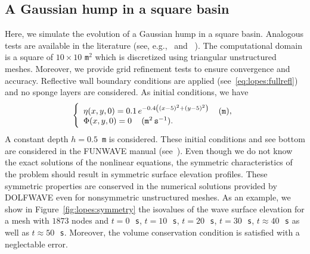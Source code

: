\subsection{A Gaussian hump in a square basin}
Here, we simulate the evolution of a Gaussian hump in a
square basin. Analogous tests are available in the
literature (see, e.g.,~\citet{WeiKirby1995} and
~\citet{WooLiu2004a}).
 The computational domain is a square
of \(10\times 10\) {\tt m}\(^2\) which is discretized using
triangular unstructured meshes.
Moreover, we provide grid
refinement tests to ensure convergence and accuracy.
Reflective wall boundary conditions are applied
(see~\eqref{eq:lopes:fullrefl}) and
no sponge layers are considered.
As initial conditions, we have
\begin{equation}
\left\{
\begin{array}{l}
\eta(x,y,0)=0.1\,e^{-0.4\left((x-5)^2+(y-5)^2\right)}\,\quad
{(\tt m)},\\
\Phi(x,y,0)=0\,\quad ({\tt m}^2\,{\tt s}^{-1}).
\end{array}
\right.
\end{equation}
A constant depth \(h=0.5\)~{\tt m} is considered.  These
initial conditions and see bottom are considered in the
FUNWAVE manual (see~\citet{Kirby1998}).  Even though we do
not know the exact solutions of the nonlinear equations, the
symmetric characteristics of the problem should result in
symmetric surface elevation profiles.  These symmetric
properties are conserved in the numerical solutions provided
by DOLFWAVE even for
nonsymmetric unstructured meshes.
As an example,  we show in Figure~\ref{fig:lopes:symmetry}
the isovalues of the wave surface elevation for a mesh with
$1873$ nodes and $t=0$\,~{\tt s}, $t=10$\,~{\tt s},
$t=20$\,~{\tt s}, $t=30$\,~{\tt s}, $t\approx 40$\,~{\tt s}
as well as $t\approx 50$\,~{\tt s}.
Moreover, the volume  conservation condition is satisfied
with a neglectable error.

